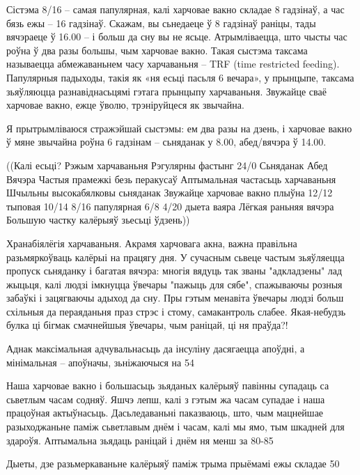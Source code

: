Сістэма 8/16 – самая папулярная, калі харчовае вакно складае 8 гадзінаў, а час бязь ежы – 16 гадзінаў. Скажам, вы сьнедаеце ў 8 гадзінаў раніцы, тады вячэраеце ў 16.00 -- і больш да сну вы не ясьце. Атрымліваецца, што чысты час роўна ў два разы большы, чым харчовае вакно. Такая сыстэма таксама называецца абмежаваньнем часу харчаваньня – TRF (time restricted feeding). Папулярныя падыходы, такія як «ня есьці пасьля 6 вечара», у прынцыпе, таксама зьяўляюцца разнавіднасьцямі гэтага прынцыпу харчаваньня. Звужайце сваё харчовае вакно, ежце ўволю, трэніруйцеся як звычайна.

Я прытрымліваюся стражэйшай сыстэмы: ем два разы на дзень, і харчовае вакно ў мяне звычайна роўна 6 гадзінам – сьняданак у 8.00, абед/вячэра ў 14.00.

((Калі есьці? Рэжым харчаваньня Рэгулярны фастынг 24/0 Сьняданак Абед Вячэра Частыя прамежкі безь перакусаў Аптымальная частасьць харчаваньня Шчыльны высокабялковы сьняданак Звужайце харчовае вакно плыўна 12/12 тыповая 10/14 8/16 папулярная 6/8 4/20 дыета ваяра Лёгкая раньняя вячэра Большую частку калёрыяў зьесьці ўдзень))

Хранабіялёгія харчаваньня. Акрамя харчовага акна, важна правільна разьмяркоўваць калёрыі на працягу дня. У сучасным сьвеце частым зьяўляецца пропуск сьняданку і багатая вячэра: многія вядуць так званы "адкладзены" лад жыцьця, калі людзі імкнуцца ўвечары "пажыць для сябе", спажываючы розныя забаўкі і зацягваючы адыход да сну. Пры гэтым менавіта ўвечары людзі больш схільныя да пераяданьня праз стрэс і стому, самакантроль слабее. Якая-небудзь булка ці бігмак смачнейшыя ўвечары, чым раніцай, ці ня праўда?!

Аднак максімальная адчувальнасьць да інсуліну дасягаецца апоўдні, а мінімальная – апоўначы, зьніжаючыся на 54%

Наша харчовае вакно і большасьць зьяданых калёрыяў павінны супадаць са сьветлым часам содняў. Яшчэ лепш, калі з гэтым жа часам супадае і наша працоўная актыўнасьць. Дасьледаваньні паказваюць, што, чым мацнейшае разыходжаньне паміж сьветлавым днём і часам, калі мы ямо, тым шкадней для здароўя. Аптымальна зьядаць раніцай і днём ня менш за 80-85%

Дыеты, дзе разьмеркаваньне калёрыяў паміж трыма прыёмамі ежы складае 50%

